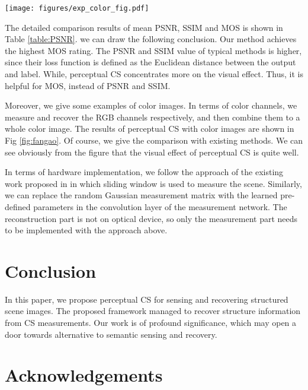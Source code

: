 \documentclass[runningheads]{llncs}
\begin{document}
\begin{figure*}[!b]
  \centering
  \texttt{[image: figures/exp\_color\_fig.pdf]}\\
  \caption{The reconstructed results of ReconNet~\cite{Kulkarni2016ReconNet}, Adp-Rec~\cite{Xie2017Adaptive}, FCMN~\cite{xie2017Fully}, and the proposed method using the conv2\_2 and conv3\_4 of VGG19~\cite{Simonyan2014Very} with measurement rate 1\% and 4\% and their corresponding original scene image.}
  \label{fig:fangao}
\end{figure*}

The detailed comparison results of mean PSNR, SSIM and MOS is shown in Table \ref{table:PSNR}. we can draw the following conclusion. Our method achieves the highest MOS rating. The PSNR and SSIM value of typical methods is higher, since their loss function is defined as the Euclidean distance between the output and label. While, perceptual CS concentrates more on the visual effect. Thus, it is helpful for MOS, instead of PSNR and SSIM.

Moreover, we give some examples of color images. In terms of color channels, we measure and recover the RGB channels respectively, and then combine them to a whole color image. The results of perceptual CS with color images are shown in Fig \ref{fig:fangao}. Of course, we give the comparison with existing methods. We can see obviously from the figure that the visual effect of perceptual CS is quite well.

In terms of hardware implementation, we follow the approach of the existing work proposed in \cite{shi2011hr} in which sliding window is used to measure the scene. Similarly, we can replace the random Gaussian measurement matrix with the learned pre-defined parameters in the convolution layer of the measurement network. The reconstruction part is not on optical device, so only the measurement part needs to be implemented with the approach above.

\section{Conclusion}

In this paper, we propose perceptual CS for sensing and recovering structured scene images.
The proposed framework managed to recover structure information from CS measurements.
Our work is of profound significance, which may open a door towards alternative to semantic sensing and recovery.

\section*{Acknowledgements}
\end{document}
